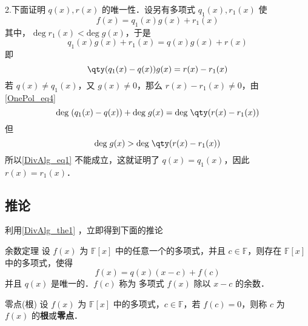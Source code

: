 2.下面证明 $q(x),r(x)$ 的唯一性．设另有多项式 $q_1(x),r_1(x)$ 使
\begin{equation}
f(x)=q_1(x)g(x)+r_1(x)
\end{equation}
其中， $\mathrm{deg}\;r_1(x)<\mathrm{deg}\;g(x)$，于是
\begin{equation}
q_1(x)g(x)+r_1(x)=q(x)g(x)+r(x)
\end{equation}
即
\begin{equation}
\qty(q_1(x)-q(x))g(x)=r(x)-r_1(x)
\end{equation}
若 $q(x)\neq q_1(x)$，又 $g(x)\neq 0$，那么 $r(x)-r_1(x)\neq 0$，由\autoref{OnePol_eq4}~
\begin{equation}\label{DivAlg_eq1}
\mathrm{deg}\;(q_1(x)-q(x))+\mathrm{deg}\;g(x)=\mathrm{deg}\;\qty(r(x)-r_1(x))
\end{equation}
但
\begin{equation}
\mathrm{deg}\;g(x)>\mathrm{deg}\;\qty(r(x)-r_1(x))
\end{equation}
所以\autoref{DivAlg_eq1} 不能成立，这就证明了
$q(x)=q_1(x)$，因此 $r(x)=r_1(x)$．
\subsection{推论}
利用\autoref{DivAlg_the1} ，立即得到下面的推论
\begin{corollary}{余数定理}
设 $f(x)$ 为 $\mathbb{F}[x]$ 中的任意一个的多项式，并且 $c\in\mathbb{F}$，则存在 $\mathbb{F}[x]$ 中的多项式，使得
\begin{equation}
f(x)=q(x)(x-c)+f(c)
\end{equation}
并且 $q(x)$ 是唯一的．$f(c)$ 称为 多项式 $f(x)$ 除以 $x-c$ 的余数．
\end{corollary}
\begin{definition}{零点(根)}
设 $f(x)$ 为 $\mathbb{F}[x]$ 中的多项式，$c\in\mathbb{F}$，若 $f(c)=0$，则称 $c$ 为 $f(x)$ 的\textbf{根}或\textbf{零点}．
\end{definition}